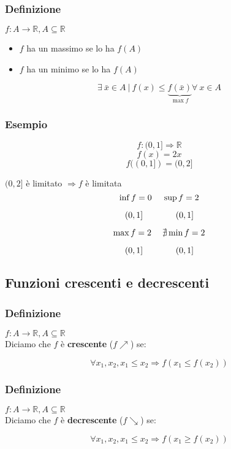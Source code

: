 \subsubsection*{Definizione}
$f:A \rightarrow \mathbb{R}, A \subseteq \mathbb{R}$
\begin{itemize}
    \item $f$ ha un massimo se lo ha $f(A)$
    \item $f$ ha un minimo se lo ha $f(A)$
\end{itemize}
\begin{Large}
    \[
        \exists\ \bar{x} \in A\ |\ f(x) \leq \underbrace{f(\bar{x})}_{\max{f}} \forall\ x \in A
    \]
\end{Large}
\subsubsection*{Esempio}
\[
    f:(0,1]\Rightarrow\mathbb{R}    
\]
\[
    f(x) = 2x    
\]
\[
    f((0,1]) = (0,2]    
\]

$ (0,2]$ è limitato $\Rightarrow f$ è limitata
\[
    \inf{f} = 0  \text{\hspace{3ex}} \sup{f} = 2
\]
\vspace{-4.5ex}
\begin{small}
\[(0,1] \text{\hspace{9ex}} (0,1]\]
\end{small}
\[
    \max{f} = 2  \text{\hspace{3ex}} \nexists \min{f} = 2
\]
\vspace{-4ex}
\begin{small}
\[(0,1] \text{\hspace{9ex}} (0,1]\]
\end{small}

\subsection{Funzioni crescenti e decrescenti}
\subsubsection*{Definizione}
$f:A\rightarrow \mathbb{R}, A \subseteq \mathbb{R}$ \\
Diciamo che $f$ è \textbf{crescente} ($f \nearrow$) se:
\begin{Large}
    \[
        \forall x_{1},x_{2}, x_{1}\leq x_{2} \Rightarrow f(x_{1}\leq f(x_{2}))
    \]
\end{Large}
\subsubsection*{Definizione}
$f:A \rightarrow \mathbb{R}, A \subseteq \mathbb{R}$ \\
Diciamo che $f$ è \textbf{decrescente} ($f \searrow$) se:
\begin{Large}
    \[
        \forall x_{1},x_{2}, x_{1}\leq x_{2} \Rightarrow f(x_{1}\geq f(x_{2}))    
    \]
\end{Large}
